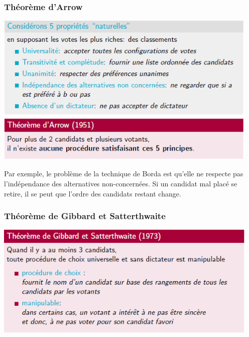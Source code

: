 \documentclass[a4paper, 12pt]{article}
\newcommand{\alinea}{
\hspace*{0.5cm}}
\begin{document}
		\subsubsection{Théorème d'Arrow}
			\begin{center}
				\includegraphics[width=5in]{Images/arrow}
			\end{center}
			\alinea Par exemple, le problème de la technique de Borda est qu'elle ne respecte pas l'indépendance des alternatives 
				non-concernées. Si un candidat mal placé se retire, il se peut que l'ordre des candidats restant change.
		\subsubsection{Théorème de Gibbard et Satterthwaite}
			\begin{center}
				\includegraphics[width=5in]{Images/gibbard}
			\end{center}
\end{document}
